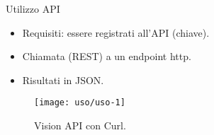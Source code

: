 %
\begin{frame}[t]{Utilizzo API}
\begin{itemize}
	\item Requisiti: essere registrati all'API (chiave).
	\item Chiamata (REST) a un endpoint \textsf{http}.
	\item Risultati in JSON.
\end{itemize}
\begin{figure}[h]
\centering
	\texttt{[image: uso/uso-1]}
	{\tiny \caption{Vision API con Curl.}}
	\label{fig:esempio-uso}
\end{figure}
\end{frame}
%
